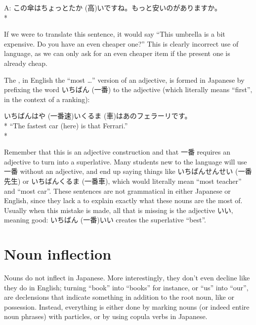 \documentclass[11pt, b5paper, twoside, openright, onecolumn]{book}
\makeatletter
\newcommand*{\rubystack}[2]{{\relscale{0.5}%
  \begin{tabular}[b]{@{}c@{}}%
    {#1}\\%
   {\textscale{2}{#2}}%
  \end{tabular}}%
}
\DeclareRobustCommand*{\ruby}[2]{%
  \mbox{%
    \setlength{\parskip}{0ex}%
    \BeginAccSupp{method=pdfstringdef,ActualText={#1}}%
      \rubystack{\phantom{#2}}{#1}%
      \llap{%
        \rubystack{#2}{\phantom{#1}}%
      }%
    \EndAccSupp{}%
  }%
}
\renewcommand*{\ruby}[2]{#2 (#1)}%
\newenvironment{exampleblock}{
\setlength{\parindent}{0.6in}
\begin{minipage}[t]{\dimexpr\textwidth-\parindent}}
{\end{minipage}}
\makeatother
\begin{document}
\vspace{0.4cm}
\begin{exampleblock}
A: この傘はちょっと\ruby{高}{たか}いですね。もっと安いのがありますか。 \\* 
\end{exampleblock}
\vspace{0.2cm}

If we were to translate this sentence‚ it would say “This umbrella is a bit expensive. Do you have an even cheaper one?” This is clearly incorrect use of language‚ as we can only ask for an even cheaper item if the present one is already cheap.

The ‚ in English the “most …” version of an adjective‚ is formed in Japanese by prefixing the word \ruby{一番}{いちばん} to the adjective (which literally means “first”‚ in the context of a ranking):

\vspace{0.4cm}
\begin{exampleblock}
\ruby{一番速}{いちばんはや}い\ruby{車}{くるま}はあのフェラーリです。 \\* 
“The fastest car (here) is that Ferrari.” \\* 
\end{exampleblock}
\vspace{0.2cm}

Remember that this is an adjective construction and that 一番 requires an adjective to turn into a superlative. Many students new to the language will use 一番 without an adjective‚ and end up saying things like \ruby{一番先生}{いちばんせんせい} or \ruby{一番車}{いちばんくるま}‚ which would literally mean “most teacher” and “most car”. These sentences are not grammatical in either Japanese or English‚ since they lack a  to explain exactly what these nouns are the most of. Usually when this mistake is made‚ all that is missing is the adjective いい‚ meaning good: \ruby{一番}{いちばん}いい creates the superlative “best”.

\section{Noun inflection}

Nouns do not inflect in Japanese. More interestingly‚ they don’t even decline like they do in English; turning “book” into “books” for instance‚ or “us” into “our”‚ are declensions that indicate something in addition to the root noun‚ like  or possession. Instead‚ everything is either done by marking nouns (or indeed entire noun phrases) with particles‚ or by using copula verbs in Japanese.
\end{document}

